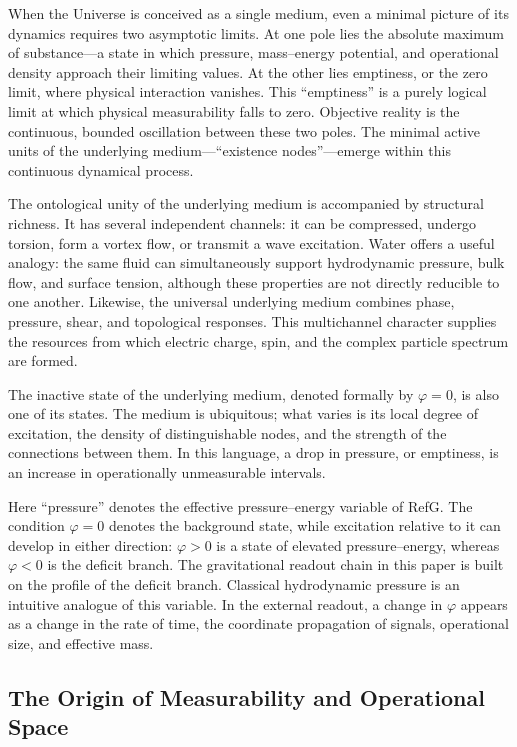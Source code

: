 \documentclass[11pt,a4paper]{article}
\begin{document}
When the Universe is conceived as a single medium, even a minimal picture of its dynamics requires two asymptotic limits. At one pole lies the absolute maximum of substance---a state in which pressure, mass--energy potential, and operational density approach their limiting values. At the other lies emptiness, or the zero limit, where physical interaction vanishes. This ``emptiness'' is a purely logical limit at which physical measurability falls to zero. Objective reality is the continuous, bounded oscillation between these two poles. The minimal active units of the underlying medium---``existence nodes''---emerge within this continuous dynamical process.

The ontological unity of the underlying medium is accompanied by structural richness. It has several independent channels: it can be compressed, undergo torsion, form a vortex flow, or transmit a wave excitation. Water offers a useful analogy: the same fluid can simultaneously support hydrodynamic pressure, bulk flow, and surface tension, although these properties are not directly reducible to one another. Likewise, the universal underlying medium combines phase, pressure, shear, and topological responses. This multichannel character supplies the resources from which electric charge, spin, and the complex particle spectrum are formed.

The inactive state of the underlying medium, denoted formally by $\varphi=0$, is also one of its states. The medium is ubiquitous; what varies is its local degree of excitation, the density of distinguishable nodes, and the strength of the connections between them. In this language, a drop in pressure, or emptiness, is an increase in operationally unmeasurable intervals.

Here ``pressure'' denotes the effective pressure--energy variable of RefG. The condition $\varphi=0$ denotes the background state, while excitation relative to it can develop in either direction: $\varphi>0$ is a state of elevated pressure--energy, whereas $\varphi<0$ is the deficit branch. The gravitational readout chain in this paper is built on the profile of the deficit branch. Classical hydrodynamic pressure is an intuitive analogue of this variable. In the external readout, a change in $\varphi$ appears as a change in the rate of time, the coordinate propagation of signals, operational size, and effective mass.

\subsection{The Origin of Measurability and Operational Space}
\end{document}
